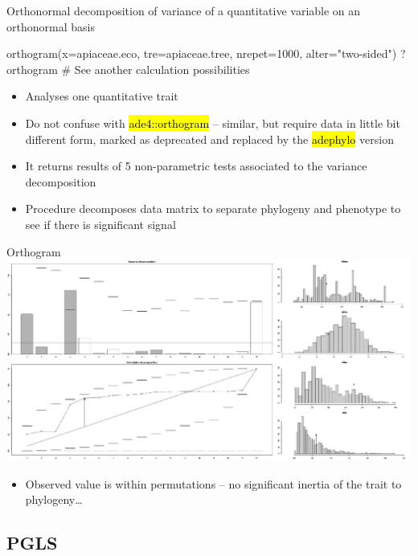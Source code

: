 \documentclass[compress, ucs, xelatex, 11pt, xcolor=svgnames,
  hyperref={
    bookmarks=true,
    unicode=true,
    colorlinks=true,
    pdftitle={Molecular data in R},
    plainpages=false,
    pdfauthor={Vojtech Zeisek},
    pdfsubject={Course about phylogeny and evolution in R},
    pdfcreator={XeLaTeX},
    pdfkeywords={R, evolution, phylogeny, molecular data},
    linkcolor=Tomato,
    anchorcolor=SaddleBrown,
    citecolor=Goldenrod,
    filecolor=DarkMagenta,
    menucolor=Sienna,
    urlcolor=DarkTurquoise,
    pdftex},
  url={hyphens, lowtilde} %
  ]{beamer}
\renewcommand{\texttt}[1]{\hl{\ttfamily #1}}
\begin{document}
\begin{frame}[fragile]{Orthonormal decomposition of variance of a quantitative variable on an orthonormal basis}
  \begin{spluscode}
    orthogram(x=apiaceae.eco, tre=apiaceae.tree, nrepet=1000,
      alter="two-sided")
    ?orthogram # See another calculation possibilities
  \end{spluscode}
  \begin{itemize}
    \item Analyses one quantitative trait
    \item Do not confuse with \texttt{ade4::orthogram} -- similar, but require data in little bit different form, marked as deprecated and replaced by the \texttt{adephylo} version
    \item It returns results of 5 non-parametric tests associated to the variance decomposition
    \item Procedure decomposes data matrix to separate phylogeny and phenotype to see if there is significant signal
  \end{itemize}
\end{frame}

\begin{frame}{Orthogram}
  \includegraphics[width=\textwidth]{orthogram.png}
  \begin{itemize}
    \item Observed value is within permutations -- no significant inertia of the trait to phylogeny\ldots
  \end{itemize}
\end{frame}

\subsection{PGLS}
\end{document}
